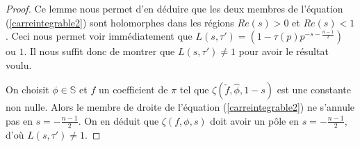 \begin{proof}
Ce lemme nous permet d'en déduire que les deux membres de l'équation (\ref{carreintegrable2}) sont holomorphes dans les régions $Re(s) > 0$ et $Re(s) < 1$. Ceci nous permet voir immédiatement que $L(s, \tau') = (1-\tau(p)p^{-s-\frac{n-1}{2}})$ ou $1$. Il nous suffit donc de montrer que $L(s, \tau') \neq 1$ pour avoir le résultat voulu.

On choisit $\phi \in \mathbb{S}$ et $f$ un coefficient de $\pi$ tel que $\zeta(\check{f}, \hat{\phi}, 1-s)$ est une constante non nulle. Alors le membre de droite de l'équation (\ref{carreintegrable2}) ne s'annule pas en $s=-\frac{n-1}{2}$. On en déduit que $\zeta(f, \phi, s)$ doit avoir un pôle en $s=-\frac{n-1}{2}$, d'où $L(s,\tau')\neq 1$.
\end{proof}